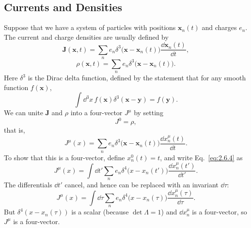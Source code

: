 
\subsection{Currents and Densities}\label{sec:2.6}

Suppose that we have a system of particles with positions
\(\mathbf{x}_n(t)\) and charges \(e_n\). The current and charge densities are
usually defined by
\begin{equation}
  \mathbf J(\mathbf x,t)
  =\sum_n e_n\delta^3\bigl(\mathbf x-\mathbf x_n(t)\bigr)
  \frac{\dd\mathbf x_n(t)}{\dd t},
  \tag{2.6.1}\label{eq:2.6.1}
\end{equation}
\begin{equation}
  \rho(\mathbf x,t)
  =\sum_n e_n\delta^3\bigl(\mathbf x-\mathbf x_n(t)\bigr).
  \tag{2.6.2}\label{eq:2.6.2}
\end{equation}
Here \(\delta^3\) is the Dirac delta function, defined by the statement that
for any smooth function \(f(\mathbf x)\),
\[
  \int \dd^3x\,f(\mathbf x)\delta^3(\mathbf x-\mathbf y)=f(\mathbf y).
\]
We can unite \(\mathbf J\) and \(\rho\) into a four-vector \(J^\mu\) by
setting
\begin{equation}
  J^0=\rho,
  \tag{2.6.3}\label{eq:2.6.3}
\end{equation}
that is,
\begin{equation}
  J^\mu(x)
  =\sum_n e_n\delta^3\bigl(\mathbf x-\mathbf x_n(t)\bigr)
  \frac{\dd x_n^\mu(t)}{\dd t}.
  \tag{2.6.4}\label{eq:2.6.4}
\end{equation}
To show that this is a four-vector, define \(x_n^0(t)=t\), and write
Eq.~\eqref{eq:2.6.4} as
\[
  J^\mu(x)=\int \dd t'\sum_n e_n
  \delta^4\bigl(x-x_n(t')\bigr)\frac{\dd x_n^\mu(t')}{\dd t'} .
\]
The differentials \(\dd t'\) cancel, and hence can be replaced with an invariant
\(\dd\tau\):
\begin{equation}
  J^\mu(x)=\int \dd\tau\sum_n e_n
  \delta^4\bigl(x-x_n(\tau)\bigr)\frac{\dd x_n^\mu(\tau)}{\dd\tau}.
  \tag{2.6.5}\label{eq:2.6.5}
\end{equation}
But \(\delta^4(x-x_n(\tau))\) is a scalar (because
\(\det\Lambda=1\)) and \(\dd x_n^\mu\) is a four-vector, so \(J^\mu\) is a
four-vector.

